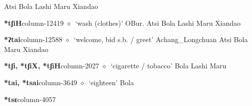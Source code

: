 \hspace{1ex}
         Atsi 
\hspace{1ex}
         Bola 
\hspace{1ex}
         Lashi 
\hspace{1ex}
         Maru 
\hspace{1ex}
         Xiandao 
  \item {\footnotesize \textbf{*tʃiH}}{\tiny column-12419}
         $\diamond$~`wash (clothes)'
         OBur. 
\hspace{1ex}
         Atsi 
\hspace{1ex}
         Bola 
\hspace{1ex}
         Lashi 
\hspace{1ex}
         Maru 
\hspace{1ex}
         Xiandao 
  \item {\footnotesize \textbf{*ʔtai}}{\tiny column-12588}
         $\diamond$~`welcome, bid s.b. / greet'
         Achang\_Longchuan 
\hspace{1ex}
         Atsi 
\hspace{1ex}
         Bola 
\hspace{1ex}
         Maru 
\hspace{1ex}
         Xiandao 
  \item {\footnotesize \textbf{*tʃi, *tʃiX, *tʃiH}}{\tiny column-2027}
         $\diamond$~`cigarette / tobacco'
         Bola 
\hspace{1ex}
         Lashi 
\hspace{1ex}
         Maru 
  \item {\footnotesize \textbf{*tai, *tsai}}{\tiny column-3649}
         $\diamond$~`eighteen'
         Bola 
  \item {\footnotesize \textbf{*tsɛ}}{\tiny column-4057}
